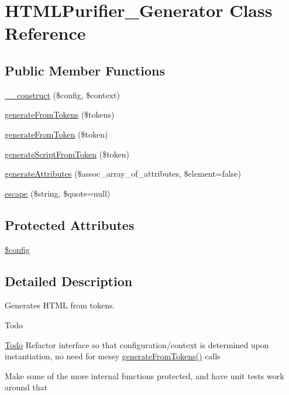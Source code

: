 \hypertarget{classHTMLPurifier__Generator}{\section{H\+T\+M\+L\+Purifier\+\_\+\+Generator Class Reference}
\label{classHTMLPurifier__Generator}
}
\subsection*{Public Member Functions}
\begin{DoxyCompactItemize}
\item 
\hyperlink{classHTMLPurifier__Generator_ac3757f96910c45d148a919bf637024bc}{\+\_\+\+\_\+construct} (\$config, \$context)
\item 
\hyperlink{classHTMLPurifier__Generator_a87d1cc1c87c14df7fc19ecdfeb5bda50}{generate\+From\+Tokens} (\$tokens)
\item 
\hyperlink{classHTMLPurifier__Generator_a78ad5c6b8c5963d60baf5b2badd249f2}{generate\+From\+Token} (\$token)
\item 
\hyperlink{classHTMLPurifier__Generator_a14d2e83ac6500ed9de9acdf2c3350791}{generate\+Script\+From\+Token} (\$token)
\item 
\hyperlink{classHTMLPurifier__Generator_a4f049d3cbfcdbb46c5eb9e424f298537}{generate\+Attributes} (\$assoc\+\_\+array\+\_\+of\+\_\+attributes, \$element=false)
\item 
\hyperlink{classHTMLPurifier__Generator_a99506b7d90f173bba8a26ddc0ced9657}{escape} (\$string, \$quote=null)
\end{DoxyCompactItemize}
\subsection*{Protected Attributes}
\begin{DoxyCompactItemize}
\item 
\hyperlink{classHTMLPurifier__Generator_a42a40024d1f996b1fc78ab9f979b1801}{\$config}
\end{DoxyCompactItemize}


\subsection{Detailed Description}
Generates H\+T\+M\+L from tokens. \begin{DoxyRefDesc}{Todo}
\item[\hyperlink{todo__todo000016}{Todo}]Refactor interface so that configuration/context is determined upon instantiation, no need for messy \hyperlink{classHTMLPurifier__Generator_a87d1cc1c87c14df7fc19ecdfeb5bda50}{generate\+From\+Tokens()} calls 

Make some of the more internal functions protected, and have unit tests work around that \end{DoxyRefDesc}


